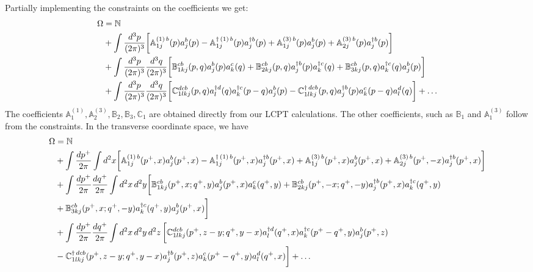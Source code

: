 \documentclass[aps,prd,amsmath,amssymb,nofootinbib]{revtex4-2}
\def\mf#1{\mathbb{#1}}
\numberwithin{equation}{section}
\begin{document}
 Partially implementing the constraints on the coefficients we get:
\begin{align}
    \Omega  & = \mf{N}  \notag \\ & +
                \int \frac{d^3p}{(2\pi)^3} 
                \bigg[ 
                   \mf{A}^{(1)\, b}_{1j}(p)a^{b}_{j}(p) 
                -  \mf{A}^{\dagger\, (1)\, b}_{1j} (p) a^{\dagger b}_{j}(p)+ \mf{A}^{(3)\, b}_{1j}(p)a^{b}_{j}(p) 
                +  \mf{A}^{(3)\, b}_{2j} (p) a^{\dagger b}_{j}(p)\bigg] \notag \\ & 
               +\int \frac{d^3p}{(2\pi)^3} \frac{d^3q}{(2\pi)^3} 
               \bigg[\mf{B}^{cb}_{1kj}(p,q) a^{b}_{j}(p)a^{c}_{k}(q) 
                   + \mf{B}^{cb}_{2kj}(p,q) a^{\dagger b}_{j}(p)a^{\dagger c}_{k}(q)
               + \mf{B}^{cb}_{3kj} (p,q) a^{\dagger c}_{k}(q)a^{b}_{j}(p)
               \bigg] \notag \\ & 
               + \int 
               \frac{d^3p}{(2\pi)^3} \frac{d^3q}{(2\pi)^3} 
               \bigg[
                \mf{C}^{ dcb}_{1lkj}(p,q) a^{\dagger d}_{l}(q)  a^{\dagger c}_{k}(p-q)  a^{b}_{j}(p)
               - \mf{C}^{\dagger\, dcb}_{1lkj}(p,q) a^{\dagger b}_{j}(p) a^{c}_{k}(p-q) a^{d}_{l}(q)\bigg] +\ldots
\end{align}
The coefficients $\mf{A}^{(1)}_{1}, \mf{A}^{(3)}_{2}, \mf{B}_{2}, \mf{B}_{3}, \mf{C}_{1}$ are obtained directly from our LCPT calculations. The other coefficients, such as $\mf{B}_{1}$ and $\mf{A}^{(3)}_{1}$ follow from the constraints. In the transverse coordinate space, we have
\begin{align}
    \Omega & = \mf{N} \notag \\ & +
                \int \frac{d p^+}{2\pi} 
             \int d^2 x  
                \bigg[\mf{A}^{(1)\, b}_{1j}(p^{+},x)a^{b}_{j}(p^{+},x) 
                -  \mf{A}^{\dagger\, (1)\, b}_{1j} (p^{+},x) a^{\dagger b}_{j}(p^{+},x)+ \mf{A}^{(3)\, b}_{1j}(p^{+},x)a^{b}_{j}(p^{+},x) 
                +  \mf{A}^{(3)\, b}_{2j} (p^{+},-x) a^{\dagger b}_{j}(p^{+},x)\bigg] \notag \\ & 
               +\int \frac{d p^+}{2\pi} \frac{d q^+}{2\pi} \int d^2x\, d^2y  
               \bigg[\mf{B}^{cb}_{1kj}(p^{+}, x;q^{+}, y) a^{b}_{j}(p^{+},x)a^{c}_{k}(q^{+},y) 
                   + \mf{B}^{cb}_{2kj}(p^{+},-x; q^{+},-y) a^{\dagger b}_{j}(p^{+},x)a^{\dagger c}_{k}(q^{+},y)
            \notag \\ & 
                  + \mf{B}^{cb}_{3kj} (p^{+},x; q^{+}, -y) a^{\dagger c}_{k}(q^{+},y)a^{b}_{j}(p^{+},x)\bigg] \notag \\ & 
               + \int 
               \frac{d p^+}{2\pi} \frac{dq^+}{2\pi} 
               \int d^2x\, d^2y\,  d^2 z\, 
               \bigg[\mf{C}^{ dcb}_{1lkj}(p^{+},z-y; q^{+},y-x) a^{\dagger d}_{l}(q^{+},x)  a^{\dagger c}_{k}(p^{+}-q^{+}, y)  a^{b}_{j}(p^{+},z)
               \notag \\ & 
               -  \mf{C}^{\dagger\, dcb}_{1lkj}(p^{+},z-y; q^{+}, y-x) a^{\dagger b}_{j}(p^{+},z) a^{c}_{k}(p^{+}-q^{+},y) a^{d}_{l}(q^{+},x)\bigg] + \ldots
\end{align}
\end{document}
